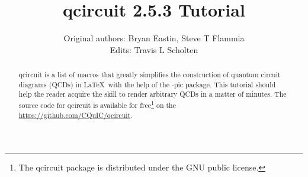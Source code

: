 \documentclass[twocolumn,nofootinbib]{revtex4}
\begin{document}
\lstset{language=TeX}

\title{qcircuit 2.5.3 Tutorial}

\author{Original authors: Bryan Eastin, Steve T Flammia\\ Edits: Travis L Scholten}
	
\begin{abstract}qcircuit is a list of macros that greatly simplifies the construction of 
quantum circuit diagrams (QCDs) in \LaTeX \ with the help of the \Xy-pic 
package.  This tutorial should help the reader acquire 
the skill to render arbitrary QCDs in a matter of minutes. The source code for qcircuit is available for free\footnote{The qcircuit package is distributed under the GNU public license.} on the \href{CQuIC GitHub page}{https://github.com/CQuIC/qcircuit}.
\end{abstract}

\maketitle
\end{document}
